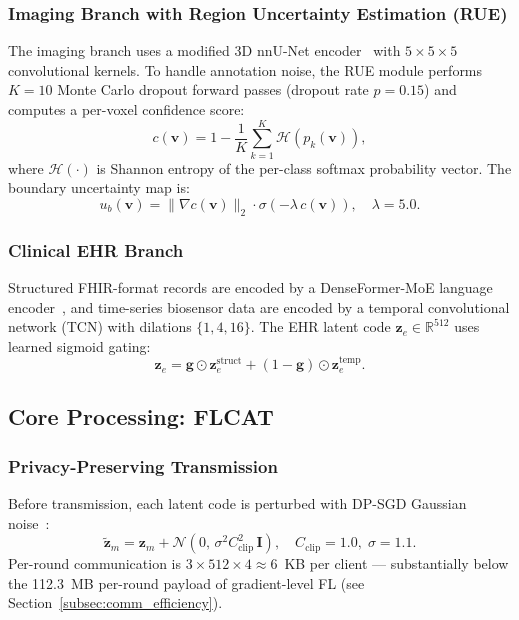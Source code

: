 \documentclass{ieeeaccess}
\begin{document}
\subsubsection{Imaging Branch with Region Uncertainty Estimation (RUE)}
The imaging branch uses a modified 3D nnU-Net encoder~\cite{isensee2021nnunet}
with $5\!\times\!5\!\times\!5$ convolutional kernels. To handle annotation
noise, the RUE module performs $K\!=\!10$ Monte Carlo dropout forward passes
(dropout rate $p\!=\!0.15$) and computes a per-voxel confidence score:
\begin{equation}
c(\mathbf{v}) = 1 - \frac{1}{K}\sum_{k=1}^{K}\mathcal{H}(p_k(\mathbf{v})),
\label{eq:confidence}
\end{equation}
where $\mathcal{H}(\cdot)$ is Shannon entropy of the per-class softmax
probability vector. The boundary uncertainty map is:
\begin{equation}
u_b(\mathbf{v}) = \|\nabla c(\mathbf{v})\|_2 \cdot
\sigma(-\lambda\,c(\mathbf{v})),\quad \lambda\!=\!5.0.
\label{eq:bunc}
\end{equation}

\subsubsection{Clinical EHR Branch}
Structured FHIR-format records are encoded by a DenseFormer-MoE language
encoder~\cite{denseformer2024}, and time-series biosensor data are encoded by a
temporal convolutional network (TCN) with dilations $\{1,4,16\}$. The EHR
latent code $\mathbf{z}_e \in \mathbb{R}^{512}$ uses learned sigmoid gating:
\begin{equation}
\mathbf{z}_e = \mathbf{g} \odot \mathbf{z}_e^{\text{struct}} +
(1-\mathbf{g}) \odot \mathbf{z}_e^{\text{temp}}.
\label{eq:ehr_gate}
\end{equation}

\subsection{Core Processing: FLCAT}
\label{subsec:flcat}

\subsubsection{Privacy-Preserving Transmission}
Before transmission, each latent code is perturbed with DP-SGD Gaussian
noise~\cite{abadi2016dpsgd}:
\begin{equation}
\tilde{\mathbf{z}}_m = \mathbf{z}_m +
\mathcal{N}(0,\,\sigma^2 C_{\mathrm{clip}}^2\,\mathbf{I}),\quad
C_{\mathrm{clip}}\!=\!1.0,\;\sigma\!=\!1.1.
\label{eq:dp}
\end{equation}
Per-round communication is $3\!\times\!512\!\times\!4\!\approx\!6$~KB per
client --- substantially below the 112.3~MB per-round payload of gradient-level FL (see Section~\ref{subsec:comm_efficiency}).
\end{document}
